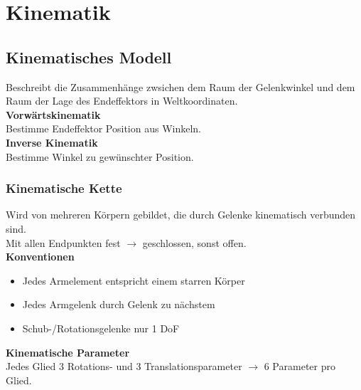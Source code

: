 

\section{Kinematik}
\subsection{Kinematisches Modell}
Beschreibt die Zusammenhänge zwsichen dem Raum der Gelenkwinkel und dem Raum der Lage des Endeffektors in
Weltkoordinaten.\\

\textbf{Vorwärtskinematik}\\
Bestimme Endeffektor Position aus Winkeln.\\

\textbf{Inverse Kinematik}\\
Bestimme Winkel zu gewünschter Position.\\

\subsubsection{Kinematische Kette}
Wird von mehreren Körpern gebildet, die durch Gelenke kinematisch verbunden sind.\\
Mit allen Endpunkten fest \(\rightarrow\) geschlossen, sonst offen.\\

\textbf{Konventionen}
\begin{itemize}
\item Jedes Armelement entspricht einem starren Körper
\item Jedes Armgelenk durch Gelenk zu nächstem
\item Schub-/Rotationsgelenke nur 1 DoF
\end{itemize}

\textbf{Kinematische Parameter}\\
Jedes Glied 3 Rotations- und 3 Translationsparameter \(\rightarrow\) 6 Parameter pro Glied.

